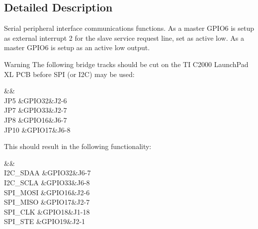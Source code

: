 \subsection{Detailed Description}
Serial peripheral interface communications functions. As a master G\-P\-I\-O6 is setup as external interrupt 2 for the slave service request line, set as active low. As a master G\-P\-I\-O6 is setup as an active low output.

\begin{DoxyWarning}{Warning}
The following bridge tracks should be cut on the T\-I C2000 Launch\-Pad X\-L P\-C\-B before S\-P\-I (or I2\-C) may be used\-: \begin{TabularC}{3}
\hline
{}\PBS{}&\PBS{}&\PBS{}\\
\PBS\centering J\-P5 &\PBS\centering G\-P\-I\-O32&\PBS\centering J2-\/6 \\
\PBS\centering J\-P7 &\PBS\centering G\-P\-I\-O33&\PBS\centering J2-\/7 \\
\PBS\centering J\-P8 &\PBS\centering G\-P\-I\-O16&\PBS\centering J6-\/7 \\
\PBS\centering J\-P10 &\PBS\centering G\-P\-I\-O17&\PBS\centering J6-\/8 \\
\end{TabularC}
This should result in the following functionality\-: \begin{TabularC}{3}
\hline
{}\PBS{}&\PBS{}&\PBS{}\\
\PBS\centering I2\-C\-\_\-\-S\-D\-A\-A &\PBS\centering G\-P\-I\-O32&\PBS\centering J6-\/7 \\
\PBS\centering I2\-C\-\_\-\-S\-C\-L\-A &\PBS\centering G\-P\-I\-O33&\PBS\centering J6-\/8 \\
\PBS\centering S\-P\-I\-\_\-\-M\-O\-S\-I &\PBS\centering G\-P\-I\-O16&\PBS\centering J2-\/6 \\
\PBS\centering S\-P\-I\-\_\-\-M\-I\-S\-O &\PBS\centering G\-P\-I\-O17&\PBS\centering J2-\/7 \\
\PBS\centering S\-P\-I\-\_\-\-C\-L\-K &\PBS\centering G\-P\-I\-O18&\PBS\centering J1-\/18 \\
\PBS\centering S\-P\-I\-\_\-\-S\-T\-E &\PBS\centering G\-P\-I\-O19&\PBS\centering J2-\/1 \\
\end{TabularC}

\end{DoxyWarning}


